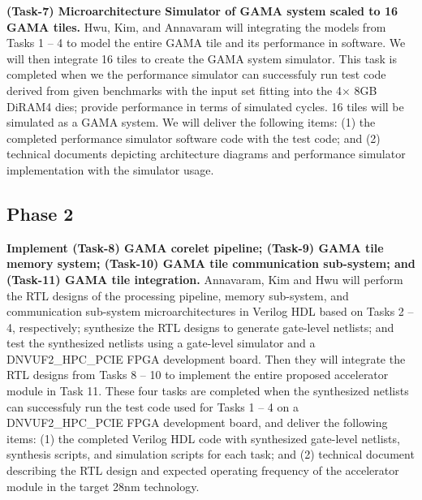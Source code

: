 \noindent
\textbf{(Task-7) Microarchitecture Simulator of GAMA system scaled to 16 GAMA tiles.}
Hwu, Kim, and Annavaram will integrating the models from Tasks 1 -- 4 to model the entire GAMA tile and its performance in software. We will then integrate 16 tiles to create the GAMA system simulator. 
This task is completed when we the performance simulator can successfuly run test code derived from given benchmarks with the input set fitting into the 4$\times$ 8GB DiRAM4 dies; provide performance in terms of simulated cycles. 16 tiles will be simulated as a GAMA system. We will deliver the following items:
(1) the completed performance simulator software code with the test code; and (2) technical documents depicting architecture diagrams and performance simulator implementation with the simulator usage.


\noindent
\subsection{Phase 2}
%

\noindent
\textbf{Implement (Task-8) GAMA corelet pipeline; (Task-9) GAMA tile memory system; (Task-10) GAMA tile communication sub-system; and (Task-11) GAMA tile integration.}
 Annavaram, Kim and Hwu will perform the RTL designs of the processing pipeline, memory sub-system, and communication sub-system microarchitectures in Verilog HDL based on Tasks 2 -- 4, respectively; synthesize the RTL designs to generate gate-level netlists; and test the synthesized netlists using a gate-level simulator and a DNVUF2\_HPC\_PCIE FPGA development board.  
Then they will integrate the RTL designs from Tasks 8 -- 10 to implement the entire proposed accelerator module in Task 11. 
These four tasks are completed when the synthesized netlists can successfuly run the test code used for Tasks 1 -- 4 on a DNVUF2\_HPC\_PCIE FPGA development board, and deliver the following items:
(1) the completed Verilog HDL code with synthesized gate-level netlists, synthesis scripts, and simulation scripts for each task; and 
(2) technical document describing the RTL design and expected operating frequency of the accelerator module in the target 28nm technology.


